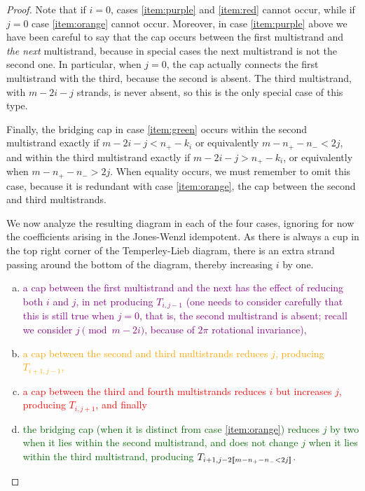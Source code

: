 \documentclass[12pt]{article}
\begin{document}
\begin{proof}
Note that if $i=0$, cases \eqref{item:purple} and \eqref{item:red} cannot occur, while if $j=0$ case \eqref{item:orange} cannot occur. Moreover, in case \eqref{item:purple} above we have been careful to say that the cap occurs between the first multistrand and \emph{the next} multistrand, because in special cases the next multistrand is not the second one. In particular, when $j=0$, the cap actually connects the first multistrand with the third, because the second is absent. The third multistrand, with $m-2i-j$ strands, is never absent, so this is the only special case of this type.

Finally, the bridging cap in case \eqref{item:green} occurs within the second multistrand exactly if $m-2i-j < n_+ - k_i$ or equivalently $m-n_+-n_-< 2j$, and within the third multistrand exactly if $m-2i-j > n_+ - k_i$, or equivalently when $m-n_+-n_->2j$. When equality occurs, we must remember to omit this case, because it is redundant with case \eqref{item:orange}, the cap between the second and third multistrands.

We now analyze the resulting diagram in each of the four cases, ignoring for now the coefficients arising in the Jones-Wenzl idempotent. As there is always a cup in the top right corner of the Temperley-Lieb diagram, there is an extra strand passing around the bottom of the diagram, thereby increasing $i$ by one.
\begin{enumerate}[(a)]
\item
\textcolor{purple}{
a cap between the first multistrand and the next has the effect of reducing both $i$ and $j$, in net producing $T_{i,j-1}$ (one needs to consider carefully that this is still true when $j=0$, that is, the second multistrand is absent; recall we consider $j \pmod{m-2i}$, because of $2\pi$ rotational invariance),
}
\item
\textcolor{orange}{
a cap between the second and third multistrands reduces $j$, producing $T_{i+1, j-1}$, 
}
\item
\textcolor{red}{
a cap between the third and fourth multistrands reduces $i$ but increases $j$, producing $T_{i, j+1}$, and finally
}
\item
\textcolor{DarkGreen}{
the bridging cap (when it is distinct from case \eqref{item:orange}) reduces $j$ by two when it lies within the second multistrand, and does not change $j$ when it lies within the third multistrand, producing $T_{i+1, j - 2[\![ m-n_+-n_- < 2j ]\!]}$. 
}
\end{enumerate}


\end{proof}
\end{document}

